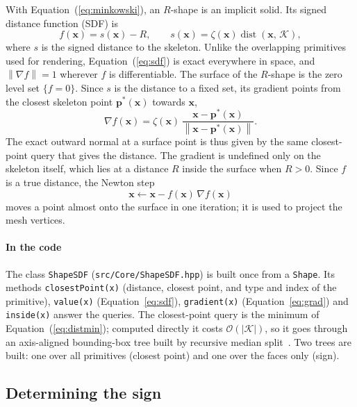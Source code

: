 \documentclass[11pt,a4paper]{article}
\newcommand{\Rmink}{R}                 %
\newcommand{\skel}{\mathcal{K}}        %
\newcommand{\sdf}{f}                   %
\newcommand{\norm}[1]{\left\lVert #1 \right\rVert}
\newcommand{\vect}[1]{\mathbf{#1}}
\newcommand{\sgnsdf}{\zeta}
\newcommand{\code}[1]{\texttt{#1}}
\begin{document}
With Equation~(\ref{eq:minkowski}), an $R$-shape is an implicit solid. Its signed
distance function (SDF) is
%
\begin{equation}
  \sdf(\vect{x}) = s(\vect{x}) - \Rmink,
  \qquad s(\vect{x}) = \sgnsdf(\vect{x})\operatorname{dist}(\vect{x},\,\skel),
  \label{eq:sdf}
\end{equation}
%
where $s$ is the signed distance to the skeleton. Unlike the overlapping
primitives used for rendering, Equation~(\ref{eq:sdf}) is exact everywhere in
space, and $\norm{\nabla\sdf}=1$ wherever $\sdf$ is differentiable. The surface of
the $R$-shape is the zero level set $\{\sdf=0\}$. Since $s$ is the distance to a
fixed set, its gradient points from the closest skeleton point
$\vect{p}^\ast(\vect{x})$ towards $\vect{x}$,
%
\begin{equation}
  \nabla \sdf(\vect{x}) = \sgnsdf(\vect{x})\,
    \frac{\vect{x}-\vect{p}^\ast(\vect{x})}{\norm{\vect{x}-\vect{p}^\ast(\vect{x})}}.
  \label{eq:grad}
\end{equation}
%
The exact outward normal at a surface point is thus given by the same
closest-point query that gives the distance. The gradient is undefined only on the
skeleton itself, which lies at a distance $\Rmink$ inside the surface when
$\Rmink>0$. Since $\sdf$ is a true distance, the Newton step
%
\begin{equation}
  \vect{x} \leftarrow \vect{x} - \sdf(\vect{x})\,\nabla\sdf(\vect{x})
  \label{eq:newton}
\end{equation}
%
moves a point almost onto the surface in one iteration; it is used to project the
mesh vertices.

\paragraph{In the code} The class \code{ShapeSDF}
(\code{src/Core/ShapeSDF.hpp}) is built once from a \code{Shape}. Its methods
\code{closestPoint(x)} (distance, closest point, and type and index of the
primitive), \code{value(x)} (Equation~\ref{eq:sdf}), \code{gradient(x)}
(Equation~\ref{eq:grad}) and \code{inside(x)} answer the queries. The
closest-point query is the minimum of Equation~(\ref{eq:distmin}); computed
directly it costs $\mathcal{O}(|\skel|)$, so it goes through an axis-aligned
bounding-box tree built by recursive median
split~\cite{vandenbergen1997,vandenbergen2003}. Two trees are built: one over all
primitives (closest point) and one over the faces only (sign).

\subsection{Determining the sign}
\label{sec:sign}
\end{document}
